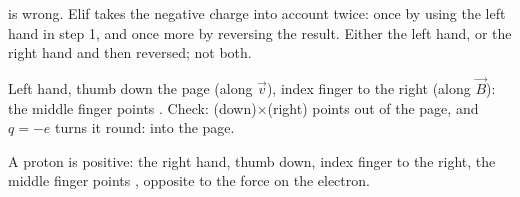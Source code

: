\begin{abcliste}
\abc {} is wrong. Elif takes the negative charge into account twice: once by using the left hand in step 1, and once more by reversing the result. Either the left hand, or the right hand and then reversed; not both.

\abc Left hand, thumb down the page (along $\vec v$), index finger to the right (along $\vec B$): the middle finger points . Check: (down)$\times$(right) points out of the page, and $q = -e$ turns it round: into the page.

\abc A proton is positive: the right hand, thumb down, index finger to the right, the middle finger points , opposite to the force on the electron.
\end{abcliste}
